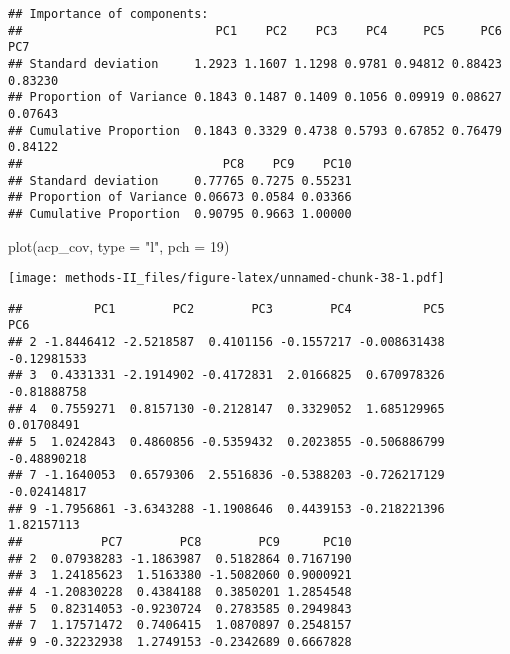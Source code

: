 \documentclass[
]{article}
\newenvironment{Shaded}{\begin{snugshade}}{\end{snugshade}}
\newcommand{\AttributeTok}[1]{\textcolor[rgb]{0.77,0.63,0.00}{#1}}
\newcommand{\DecValTok}[1]{\textcolor[rgb]{0.00,0.00,0.81}{#1}}
\newcommand{\FunctionTok}[1]{\textcolor[rgb]{0.00,0.00,0.00}{#1}}
\newcommand{\NormalTok}[1]{#1}
\newcommand{\SpecialCharTok}[1]{\textcolor[rgb]{0.00,0.00,0.00}{#1}}
\newcommand{\StringTok}[1]{\textcolor[rgb]{0.31,0.60,0.02}{#1}}
\begin{document}
\begin{verbatim}
## Importance of components:
##                           PC1    PC2    PC3    PC4     PC5     PC6     PC7
## Standard deviation     1.2923 1.1607 1.1298 0.9781 0.94812 0.88423 0.83230
## Proportion of Variance 0.1843 0.1487 0.1409 0.1056 0.09919 0.08627 0.07643
## Cumulative Proportion  0.1843 0.3329 0.4738 0.5793 0.67852 0.76479 0.84122
##                            PC8    PC9    PC10
## Standard deviation     0.77765 0.7275 0.55231
## Proportion of Variance 0.06673 0.0584 0.03366
## Cumulative Proportion  0.90795 0.9663 1.00000
\end{verbatim}

\begin{Shaded}
\begin{Highlighting}[]
\FunctionTok{plot}\NormalTok{(acp\_cov, }\AttributeTok{type =} \StringTok{"l"}\NormalTok{, }\AttributeTok{pch =} \DecValTok{19}\NormalTok{)}
\end{Highlighting}
\end{Shaded}

\texttt{[image: methods-II\_files/figure-latex/unnamed-chunk-38-1.pdf]}

\begin{Shaded}
\end{Shaded}

\begin{verbatim}
##          PC1        PC2        PC3        PC4          PC5         PC6
## 2 -1.8446412 -2.5218587  0.4101156 -0.1557217 -0.008631438 -0.12981533
## 3  0.4331331 -2.1914902 -0.4172831  2.0166825  0.670978326 -0.81888758
## 4  0.7559271  0.8157130 -0.2128147  0.3329052  1.685129965  0.01708491
## 5  1.0242843  0.4860856 -0.5359432  0.2023855 -0.506886799 -0.48890218
## 7 -1.1640053  0.6579306  2.5516836 -0.5388203 -0.726217129 -0.02414817
## 9 -1.7956861 -3.6343288 -1.1908646  0.4439153 -0.218221396  1.82157113
##           PC7        PC8        PC9      PC10
## 2  0.07938283 -1.1863987  0.5182864 0.7167190
## 3  1.24185623  1.5163380 -1.5082060 0.9000921
## 4 -1.20830228  0.4384188  0.3850201 1.2854548
## 5  0.82314053 -0.9230724  0.2783585 0.2949843
## 7  1.17571472  0.7406415  1.0870897 0.2548157
## 9 -0.32232938  1.2749153 -0.2342689 0.6667828
\end{verbatim}

\begin{Shaded}
\end{Shaded}
\end{document}
